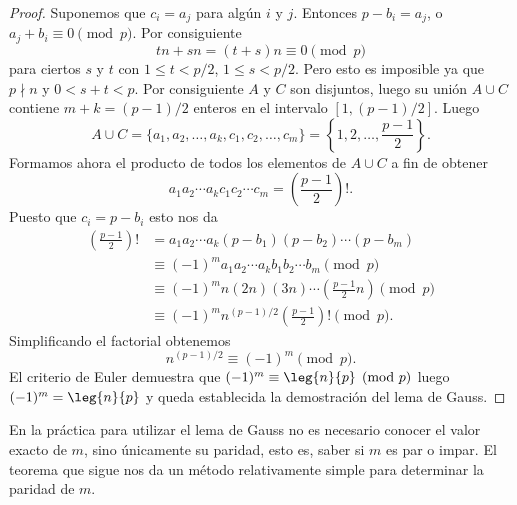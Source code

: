 \documentclass[12pt,a4paper]{book}
\begin{document}
\begin{proof}
        Suponemos que $c_{i}=a_{j}$ para algún $i$ y $j$. Entonces $p-b_{i}=a_{j}$, o
        $a_{j}+b_{i}\equiv0\pmod{p}$. Por consiguiente
        \begin{equation*}
            tn+sn=(t+s)n\equiv0\pmod{p}
        \end{equation*}
        para ciertos $s$ y $t$ con $1\leq t<p/2$, $1\leq s<p/2$. Pero esto es imposible ya
        que $p\nmid n$ y $0<s+t<p$. Por consiguiente $A$ y $C$ son disjuntos, luego su unión
        $A\cup C$ contiene $m+k=(p-1)/2$ enteros en el intervalo $[1,(p-1)/2]$. Luego
        \begin{equation*}
            A\cup C=\{a_{1},a_{2},\dots,a_{k},c_{1},c_{2},\dots,c_{m}\}=\left\{1,2,\dots,\frac{p-1}{2}\right\}.
        \end{equation*}
        Formamos ahora el producto de todos los elementos de $A\cup C$ a fin de obtener
        \begin{equation*}
            a_{1}a_{2}\cdots a_{k}c_{1}c_{2}\cdots c_{m}=\left(\frac{p-1}{2}\right)!.
        \end{equation*}
        Puesto que $c_{i}=p-b_{i}$ esto nos da
        \begin{align*}
            \left(\frac{p-1}{2}\right)!&=a_{1}a_{2}\cdots a_{k}(p-b_{1})(p-b_{2})\cdots(p-b_{m})\\
            &\equiv(-1)^{m}a_{1}a_{2}\cdots a_{k}b_{1}b_{2}\cdots b_{m}\pmod{p}\\
            &\equiv(-1)^{m}n(2n)(3n)\cdots\left(\frac{p-1}{2}n\right)\pmod{p}\\
            &\equiv(-1)^{m}n^{(p-1)/2}\left(\frac{p-1}{2}\right)!\pmod{p}.
        \end{align*}
        Simplificando el factorial obtenemos
        \begin{equation*}
            n^{(p-1)/2}\equiv(-1)^{m}\pmod{p}.
        \end{equation*}
        El criterio de Euler demuestra que $(-1)^{m}\equiv\leg{n}{p}\pmod{p}$ luego
        $(-1)^{m}=\leg{n}{p}$ y queda establecida la demostración del lema de Gauss.
    \end{proof}

    En la práctica para utilizar el lema de Gauss no es necesario conocer el valor exacto
    de $m$, sino únicamente su paridad, esto es, saber si $m$ es par o impar. El teorema
    que sigue nos da un método relativamente simple para determinar la paridad de $m$.
\end{document}
